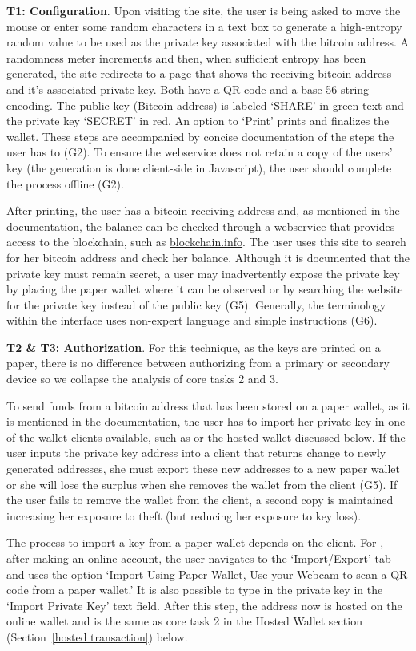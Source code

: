 \textbf{T1: Configuration}. Upon visiting the site, the user is being asked to move the mouse or enter some random characters in a text box to generate a high-entropy random value to be used as the private key associated with the bitcoin address. A randomness meter increments and then, when sufficient entropy has been generated, the site redirects to a page that shows the receiving bitcoin address and it's associated private key. Both have a QR code and a base 56 string encoding. The public key (Bitcoin address) is labeled `SHARE' in green text and the private key `SECRET' in red. An option to `Print' prints and finalizes the wallet. These steps are accompanied by concise documentation of the steps the user has to (G2). To ensure the webservice does not retain a copy of the users' key (the generation is done client-side in Javascript), the user should complete the process offline (G2).

After printing, the user has a bitcoin receiving address and, as mentioned in the documentation, the balance can be checked through a webservice that provides access to the blockchain, such as \url{blockchain.info}. The user uses this site to search for her bitcoin address and check her balance. Although it is documented that the private key must remain secret, a user may inadvertently expose the private key by placing the paper wallet where it can be observed or by searching the website for the private key instead of the public key (G5). Generally, the terminology within the \paper interface uses non-expert language and simple instructions (G6).

\textbf{T2 \& T3: Authorization}.
For this technique, as the keys are printed on a paper, there is no difference between authorizing from a primary or secondary device so we collapse the analysis of core tasks 2 and 3.
 
To send funds from a bitcoin address that has been stored on a paper wallet, as it is mentioned in the documentation, the user has to import her private key in one of the wallet clients available, such as \armory or the \block hosted wallet discussed below. If the user inputs the private key address into a client that returns change to newly generated addresses, she must export these new addresses to a new paper wallet or she will lose the surplus when she removes the wallet from the client (G5). If the user fails to remove the wallet from the client, a second copy is maintained increasing her exposure to theft (but reducing her exposure to key loss). 

The process to import a key from a paper wallet depends on the client. For \block, after making an online account, the user navigates to the `Import/Export' tab and uses the option `Import Using Paper Wallet, Use your Webcam to scan a QR code from a paper wallet.' It is also possible to type in the private key in the `Import Private Key' text field. After this step, the address now is hosted on the online wallet and is the same as core task 2 in the Hosted Wallet section (Section~\ref{hosted transaction}) below.

